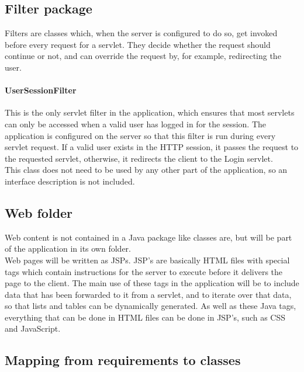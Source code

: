 \subsection{Filter package}
Filters are classes which, when the server is configured to do so, get invoked before every request for a servlet. They decide whether the request should continue or not, and can override the request by, for example, redirecting the user.
\paragraph{UserSessionFilter} This is the only servlet filter in the application, which ensures that most servlets can only be accessed when a valid user has logged in for the session. The application is configured on the server so that this filter is run during every servlet request. If a valid user exists in the HTTP session, it passes the request to the requested servlet, otherwise, it redirects the client to the Login servlet.\\
This class does not need to be used by any other part of the application, so an interface description is not included.

\subsection{Web folder}
Web content is not contained in a Java package like classes are, but will be part of the application in its own folder.\\
Web pages will be written as JSPs. JSP's are basically HTML files with special tags which contain instructions for the server to execute before it delivers the page to the client. The main use of these tags in the application will be to include data that has been forwarded to it from a servlet, and to iterate over that data, so that lists and tables can be dynamically generated. As well as these Java tags, everything that can be done in HTML files can be done in JSP's, such as CSS and JavaScript.

\subsection{Mapping from requirements to classes}

